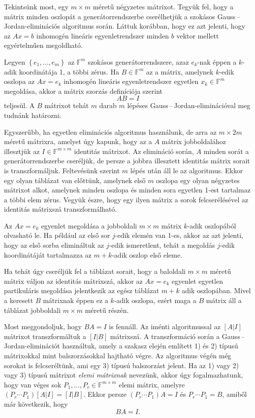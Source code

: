 \documentclass[a4paper, showtrims]{memoir}
\theoremstyle{plain}
\theoremstyle{remark}
\theoremstyle{definition}
\begin{document}
Tekintsünk most, egy $m\times m$ méretű négyzetes mátrixot.
Tegyük fel, hogy a mátrix minden oszlopát a generátorrendszerbe cserélhetjük
a szokásos Gauss\,--\,Jordan-eliminációs algoritmus  során.
Láttuk korábban, hogy ez azt jelenti, hogy az $Ax=b$ inhomogén lineáris egyenletrendszer
minden $b$ vektor mellett egyértelműen megoldható.

Legyen $\left\{ e_1,\ldots,e_m \right\}$ az $\mathbb{F}^m$ szokásos generátorrendszere,
azaz $e_k$-nak éppen a $k$-adik koordinátája 1, a többi zérus.
Ha $B\in\mathbb{F}^m$ az a mátrix,
amelynek $k$-edik oszlopa az $Ax=e_k$ inhomogén lineáris egyenletrendszer egyetlen $x_k\in\mathbb{F}^m$ megoldása,
akkor a mátrix szorzás definíciója szerint
\[
	AB=I
\]
teljesül.
A $B$ mátrixot tehát $m$ darab $m$ lépéses Gauss\,--\,Jordan-eliminációval  meg tudnánk határozni.

Egyszerűbb,
ha egyetlen eliminációs algoritmus használunk, de arra az $m\times 2m$ méretű mátrixra,
amelyet úgy kapunk, hogy az a $A$ mátrix jobboldalához illesztjük az $I\in\mathbb{F}^{m\times m}$ identitás mátrixot.
Az elimináció során,
$A$ minden sorát a generátorrendszerbe cseréljük, de persze a jobbra illesztett identitás
mátrix sorait is transzformáljuk.
Feltevésünk szerint $m$ lépés után áll le az algoritmus.
Ekkor egy  olyan táblázat van előttünk, amelynek első $m$ oszlopa egy olyan négyzetes
mátrixot alkot, amelynek minden oszlopa és minden sora egyetlen 1-est tartalmaz a többi elem zérus.
Vegyük észre,
hogy egy ilyen mátrix a sorok felcserélésével az identitás mátrixszá transzformálható.

Az $Ax=e_k$ egyenlet megoldása a jobboldali $m\times m$ mátrix $k$-adik oszlopából olvasható le.
Ha például az első sor $j$-edik elemén van 1-es,
akkor az azt jelenti, hogy az első sorba elimináltuk az $j$-edik ismeretlent,
tehát a megoldás $j$-edik koordinátáját tartalmazza az $m+k$-adik oszlop első eleme.

Ha tehát úgy cseréljük fel a táblázat sorait,
hogy a baloldali $m\times m$ méretű mátrix váljon az identitás mátrixszá,
akkor az $Ax=e_k$ egyenlet egyetlen partikuláris megoldása jelentkezik az egész táblázat
$m+k$ adik oszlopában.
Mivel a keresett $B$ mátrixnak éppen ez a $k$-adik oszlopa,
ezért maga a $B$ mátrix áll a táblázat jobboldali $m\times m$ méretű részén.

Most meggondoljuk, hogy $BA=I$ is fennáll.
Az iménti algoritmussal az $[A|I]$ mátrixot transzformáltuk a $[I|B]$ mátrixszá.
A transzformáció során a Gauss\,--\,Jordan-eliminációt használtuk,  amely a szakasz elején említett 1) és 2) típusú mátrixokkal mint balszorzásokkal hajtható végre.
Az algoritmus végén még sorokat is felcseréltünk, ami egy 3) típusú balszorzást jelent.
Ha az 1) vagy 2) vagy 3) típusú mátrixot \emph{elemi mátrixnak}
nevezünk,
akkor úgy fogalmazhatunk,
hogy van véges sok $P_1,\ldots,P_r\in\mathbb{F}^{m\times m}$ elemi mátrix, amelyre
\(
(P_r\cdots P_1)\left[ A|I \right]=\left[ I|B \right].
\)
Ekkor persze $(P_r\cdots P_1)A=I$ és $P_r\cdots P_1=B$,
amiből már következik, hogy
\[
	BA=I.
\]
\end{document}
